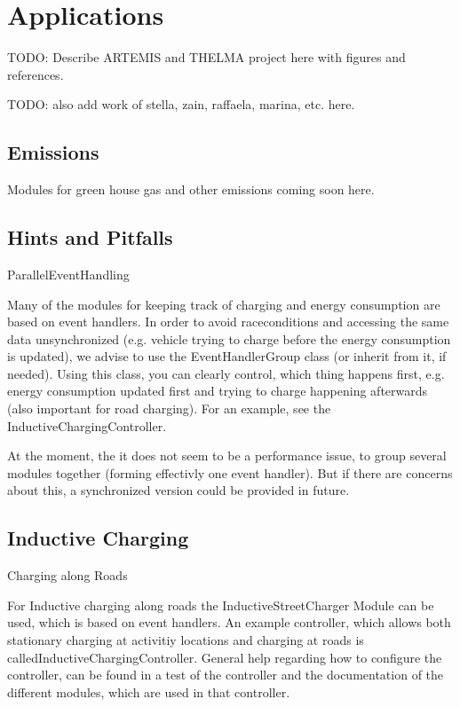 \documentclass[a4paper,11pt]{report}
\begin{document}
\vfill\eject
\chapter{Applications}

TODO: Describe ARTEMIS and THELMA project here with figures and references.



TODO: also add work of stella, zain, raffaela, marina, etc. here.

\vfill\eject
\section{Emissions}

Modules for green house gas and other emissions coming soon here.

\vfill\eject
\section{Hints and Pitfalls}

ParallelEventHandling

Many of the modules for keeping track of charging and energy  consumption are based on event handlers. In order to avoid  raceconditions and accessing the same data unsynchronized (e.g. vehicle  trying to charge before the energy consumption is updated), we advise to  use the EventHandlerGroup class (or inherit from it, if needed). Using  this class, you can clearly control, which thing happens first, e.g.  energy consumption updated first and trying to charge happening  afterwards (also important for road charging). For an example, see the  InductiveChargingController.

At the moment, the it does not seem to be a performance issue, to  group several modules together (forming effectivly one event handler).  But if there are concerns about this, a synchronized version could be  provided in future.

\vfill\eject
\section{Inductive Charging}

Charging along Roads

For Inductive charging along roads the InductiveStreetCharger Module  can be used, which is based on event handlers. An example controller,  which allows both stationary charging at activitiy locations and  charging at roads is calledInductiveChargingController. General  help regarding how to configure the controller, can be found in a test  of the controller and the documentation of the different modules, which  are used in that controller.
\end{document}

